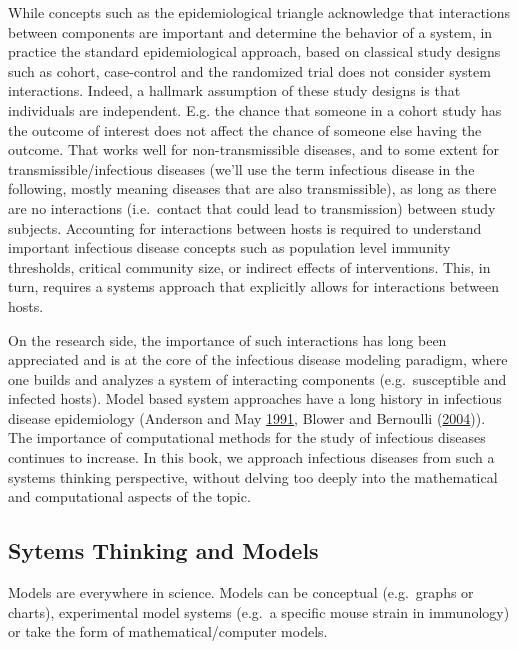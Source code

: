 \documentclass[]{article}
\theoremstyle{definition}
\theoremstyle{definition}
\theoremstyle{definition}
\theoremstyle{remark}
\begin{document}
While concepts such as the epidemiological triangle acknowledge that
interactions between components are important and determine the behavior
of a system, in practice the standard epidemiological approach, based on
classical study designs such as cohort, case-control and the randomized
trial does not consider system interactions. Indeed, a hallmark
assumption of these study designs is that individuals are independent.
E.g. the chance that someone in a cohort study has the outcome of
interest does not affect the chance of someone else having the outcome.
That works well for non-transmissible diseases, and to some extent for
transmissible/infectious diseases (we'll use the term infectious disease
in the following, mostly meaning diseases that are also transmissible),
as long as there are no interactions (i.e.~contact that could lead to
transmission) between study subjects. Accounting for interactions
between hosts is required to understand important infectious disease
concepts such as population level immunity thresholds, critical
community size, or indirect effects of interventions. This, in turn,
requires a systems approach that explicitly allows for interactions
between hosts.

On the research side, the importance of such interactions has long been
appreciated and is at the core of the infectious disease modeling
paradigm, where one builds and analyzes a system of interacting
components (e.g.~susceptible and infected hosts). Model based system
approaches have a long history in infectious disease epidemiology
(Anderson and May \protect\hyperlink{ref-anderson91}{1991}, Blower and
Bernoulli (\protect\hyperlink{ref-blower04}{2004})). The importance of
computational methods for the study of infectious diseases continues to
increase. In this book, we approach infectious diseases from such a
systems thinking perspective, without delving too deeply into the
mathematical and computational aspects of the topic.

\subsection{Sytems Thinking and
Models}\label{sytems-thinking-and-models}

Models are everywhere in science. Models can be conceptual (e.g.~graphs
or charts), experimental model systems (e.g.~a specific mouse strain in
immunology) or take the form of mathematical/computer models.
\end{document}
